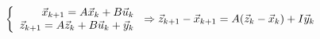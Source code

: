 \documentclass{article}
\begin{document}
\thispagestyle{empty}

$$
\left \{ \begin{array}{r l}
\vec{x}_{k+1} = A \vec{x}_k + B\vec{u}_k\\
\vec{z}_{k+1} = A \vec{z}_k + B\vec{u}_k + \vec{y}_k
\end{array} \right.
\Rightarrow
\vec{z}_{k+1}-\vec{x}_{k+1} = A(\vec{z}_k-\vec{x}_k) + I \vec{y}_k
$$
\end{document}
